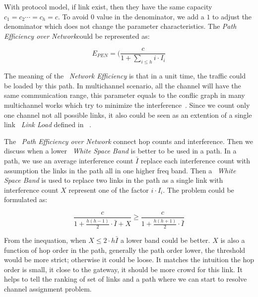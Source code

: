 With protocol model, if link exist, then they have the same capacity $c_1=c_2 \cdots =c_h=c$. 
To avoid $0$ value in the denominator, we add a $1$ to adjust the denominator which does not change the parameter characteristics. 
The \emph{Path Efficiency over Network}could be represented as:


\begin{equation}
\label{eq:pen}
E_{PEN}=(\frac{c}{1+\sum_{i \leq h} i\cdot I_i}
\end{equation}
 

The meaning of the ~\emph{Network Efficiency} is that in a unit time, the traffic could be loaded by this path. In multichannel scenario, all the channel will have the same communication range, this parameter equals to the conflic graph in many multichannel works which try to minimize the interference~\cite{jain2005impact}. Since we count only one channel not all possible links, it also could be seen as an extention of a single link ~\emph{Link Load} defined in ~\cite{raniwala2004centralized}.

The ~\emph{Path Efficiency over Network} connect hop counts and interference. 
Then we discuss when a lower ~\emph{White Space Band} is better to be used in a path.
In a path, we use an average interference count $\bar{I}$ replace each interference count with assumption the links in the path all in one higher freq band. Then a ~\emph{White Space Band} is used to replace two links in the path as a single link with interference count $X$ represent one of the factor $i\cdot I_i$. The problem could be formulated as:

 
\begin{equation}
\label{eq:benefit}
\frac{c}{1+\frac{h(h-1)}{2}\cdot \bar{I}+X} \geq \frac{c}{1+\frac{h(h+1)}{2}\cdot \bar{I}}
\end{equation}

From the inequation, when $X \leq 2\cdot h\bar{I}$ a lower band could be better. $X$ is also a function of hop order in the path, generally the path order lower, the threshold would be more strict; otherwise it could be loose. It matches the intuition the hop order is small, it close to the gateway, it should be more crowd for this link.
It helps to tell the ranking of set of links and a path where we can start to resolve channel assignment problem.








